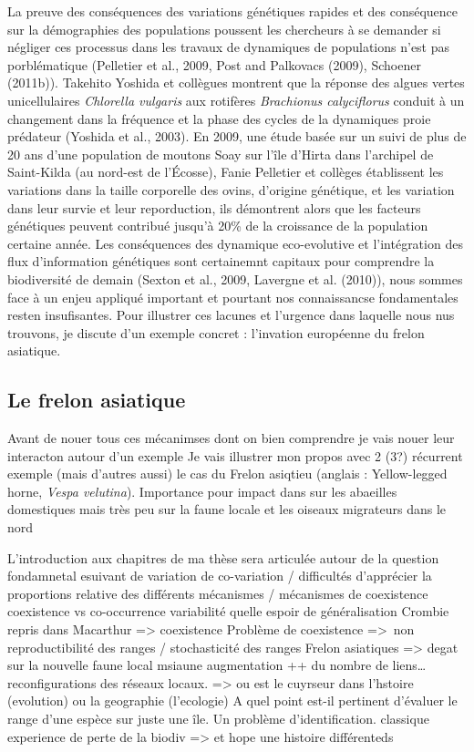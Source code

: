 La preuve des conséquences des variations génétiques rapides et des
conséquence sur la démographies des populations poussent les chercheurs
à se demander si négliger ces processus dans les travaux de dynamiques
de populations n'est pas porblématique (Pelletier et al., 2009, Post and
Palkovacs (2009), Schoener (2011b)). Takehito Yoshida et collègues
montrent que la réponse des algues vertes unicellulaires \emph{Chlorella
vulgaris} aux rotifères \emph{Brachionus calyciflorus} conduit à un
changement dans la fréquence et la phase des cycles de la dynamiques
proie prédateur (Yoshida et al., 2003). En 2009, une étude basée sur un
suivi de plus de 20 ans d'une population de moutons Soay sur l'île
d'Hirta dans l'archipel de Saint-Kilda (au nord-est de l'Écosse), Fanie
Pelletier et collèges établissent les variations dans la taille
corporelle des ovins, d'origine génétique, et les variation dans leur
survie et leur reporduction, ils démontrent alors que les facteurs
génétiques peuvent contribué jusqu'à 20\% de la croissance de la
population certaine année. Les conséquences des dynamique eco-evolutive
et l'intégration des flux d'information génétiques sont certainemnt
capitaux pour comprendre la biodiversité de demain (Sexton et al., 2009,
Lavergne et al. (2010)), nous sommes face à un enjeu appliqué important
et pourtant nos connaissancse fondamentales resten insufisantes. Pour
illustrer ces lacunes et l'urgence dans laquelle nous nus trouvons, je
discute d'un exemple concret : l'invation européenne du frelon
asiatique.

\subsection*{Le frelon asiatique}\label{le-frelon-asiatique}

Avant de nouer tous ces mécanimses dont on bien comprendre je vais nouer
leur interacton autour d'un exemple Je vais illustrer mon propos avec 2
(3?) récurrent exemple (mais d'autres aussi) le cas du Frelon asiqtieu
(anglais : Yellow-legged horne, \emph{Vespa velutina}). Importance pour
impact dans sur les abaeilles domestiques mais très peu sur la faune
locale et les oiseaux migrateurs dans le nord

L'introduction aux chapitres de ma thèse sera articulée autour de la
question fondamnetal esuivant de variation de co-variation / difficultés
d'apprécier la proportions relative des différents mécanismes /
mécanismes de coexistence coexistence vs co-occurrence variabilité
quelle espoir de généralisation Crombie repris dans Macarthur
=\textgreater{} coexistence Problème de coexistence =\textgreater{}~non
reproductibilité des ranges / stochasticité des ranges Frelon asiatiques
=\textgreater{} degat sur la nouvelle faune local msiaune augmentation
++ du nombre de liens\ldots{} reconfigurations des réseaux locaux.
=\textgreater{} ou est le cuyrseur dans l'hstoire (evolution) ou la
geographie (l'ecologie) A quel point est-il pertinent d'évaluer le range
d'une espèce sur juste une île. Un problème d'identification. classique
experience de perte de la biodiv =\textgreater{} et hope une histoire
différenteds

